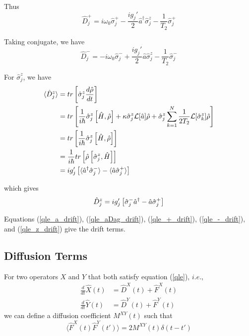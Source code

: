 \documentclass{article}
\newcommand{\lindblad}{\mathcal{L}}
\newcommand{\szj}{\hat{\sigma}^z_j}
\newcommand{\spj}{\hat{\sigma}^+_j}
\newcommand{\smj}{\hat{\sigma}^-_j}
\newcommand{\tila}{\hat{\tilde{a}}}
\newcommand{\tilspj}{\hat{\tilde{\sigma}}^+_j}
\begin{document}
Thus
\begin{equation}
\label{qle_+_drift}
    \hat{D}_j^+ = i\omega_0 \spj-\frac{ig_j'}{2} \hat{a}^\dagger \szj - \frac{1}{T_2} \spj
\end{equation}

Taking conjugate, we have
\begin{equation}
\label{qle_-_drift}
    \hat{D}_j^- = -i\omega_0 \smj+\frac{ig_j'}{2} \hat{a} \szj - \frac{1}{T_2} \smj
\end{equation}

For $\szj$, we have
\begin{align}
    \notag\langle \Hat{D}^z_j \rangle &= tr\left[\szj \frac{d\hat{\rho}}{dt}\right]\\
    \notag &= tr\left[\frac{1}{i\hbar}\szj \left[\Hat{H}, \Hat{\rho}\right]+\kappa\szj\lindblad[\hat{a}]\hat{\rho}+\szj\sum^{N}_{k=1}\frac{1}{2T_2}\lindblad[\hat{\sigma}^z_k]\hat{\rho}\right]\\
    \notag &= tr\left[\frac{1}{i\hbar}\szj\left[\Hat{H}, \Hat{\rho}\right]\right]\\
    \notag &= \frac{1}{i\hbar}tr\left[\Hat{\rho}\left[\szj, \Hat{H}\right]\right]\\
    &= ig'_j\left[\langle \hat{a}^\dagger \smj \rangle - \langle \hat{a} \spj \rangle\right]
\end{align}

which gives
\begin{equation}
\label{qle_z_drift}
   \hat{D}_j^z  = ig'_j\left[\smj \Hat{a}^\dagger   -  \Hat{a} \spj \right]
\end{equation}

Equations (\ref{qle_a_drift}), (\ref{qle_aDag_drift}), (\ref{qle_+_drift}), (\ref{qle_-_drift}), and (\ref{qle_z_drift}) give the drift terms.
\subsection{Diffusion Terms}
For two operators $X$ and $Y$ that both satisfy equation (\ref{qle}), $i.e.$, 
\begin{align}
    \frac{d}{dt}\hat{X}(t) &= \hat{D}^X(t) + \hat{F}^X(t)\\
    \frac{d}{dt}\hat{Y}(t) &= \hat{D}^Y(t) + \hat{F}^Y(t)
\end{align}
we can define a diffusion coefficient $M^{XY}(t)$ such that
\begin{equation}
    \langle \hat{F}^X(t) \hat{F}^Y(t') \rangle = 2 M^{XY}(t) \delta(t-t')
\end{equation}
\end{document}

